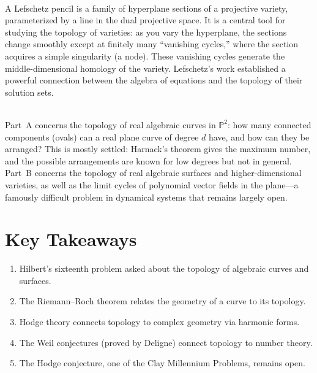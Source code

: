 \begin{description}[font=\bfseries, leftmargin=2em, style=nextline]
\item[Q: What is a Lefschetz pencil?]\hfill\\
A Lefschetz pencil is a family of hyperplane sections of a projective variety, parameterized by a line in the dual projective space. It is a central tool for studying the topology of varieties: as you vary the hyperplane, the sections change smoothly except at finitely many ``vanishing cycles,'' where the section acquires a simple singularity (a node). These vanishing cycles generate the middle-dimensional homology of the variety. Lefschetz's work established a powerful connection between the algebra of equations and the topology of their solution sets.

\item[Q: How does Hilbert's 16th problem split into two parts?]\hfill\\
Part~A concerns the topology of real algebraic curves in $\mathbb{P}^2$: how many connected components (ovals) can a real plane curve of degree $d$ have, and how can they be arranged? This is mostly settled: Harnack's theorem gives the maximum number, and the possible arrangements are known for low degrees but not in general. Part~B concerns the topology of real algebraic surfaces and higher-dimensional varieties, as well as the limit cycles of polynomial vector fields in the plane---a famously difficult problem in dynamical systems that remains largely open.

\end{description}

\section*{Key Takeaways}

\begin{enumerate}
    \item Hilbert's sixteenth problem asked about the topology of algebraic curves and surfaces.
    \item The Riemann--Roch theorem relates the geometry of a curve to its topology.
    \item Hodge theory connects topology to complex geometry via harmonic forms.
    \item The Weil conjectures (proved by Deligne) connect topology to number theory.
    \item The Hodge conjecture, one of the Clay Millennium Problems, remains open.
\end{enumerate}

